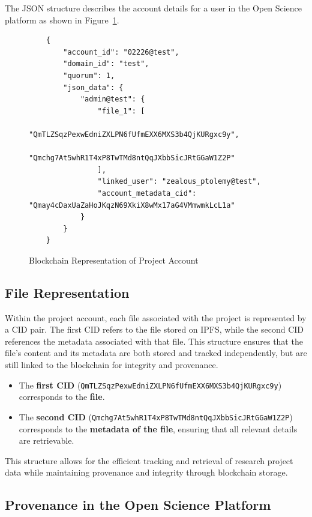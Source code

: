 \documentclass{article}
\begin{document}
The JSON structure describes the account details for a user in the Open Science platform as shown in Figure~\ref{fig:project_blockchain_representation}.


\begin{figure}[h]
      \centering
      \caption{Blockchain Representation of Project Account}
      \label{fig:project_blockchain_representation}
      \begin{verbatim}
    {
        "account_id": "02226@test",
        "domain_id": "test",
        "quorum": 1,
        "json_data": {
            "admin@test": {
                "file_1": [
                    "QmTLZSqzPexwEdniZXLPN6fUfmEXX6MXS3b4QjKURgxc9y",
                    "Qmchg7At5whR1T4xP8TwTMd8ntQqJXbbSicJRtGGaW1Z2P"
                ],
                "linked_user": "zealous_ptolemy@test",
                "account_metadata_cid": "Qmay4cDaxUaZaHoJKqzN69XkiX8wMx17aG4VMmwmkLcL1a"
            }
        }
    }
    \end{verbatim}
\end{figure}


\subsection*{File Representation}

Within the project account, each file associated with the project is represented by a CID pair. The first CID refers to the file stored on IPFS, while the second CID references the metadata associated with that file. This structure ensures that the file's content and its metadata are both stored and tracked independently, but are still linked to the blockchain for integrity and provenance.

\begin{itemize}
      \item The \textbf{first CID} (\texttt{QmTLZSqzPexwEdniZXLPN6fUfmEXX6MXS3b4QjKURgxc9y}) corresponds to the \textbf{file}.
      \item The \textbf{second CID} (\texttt{Qmchg7At5whR1T4xP8TwTMd8ntQqJXbbSicJRtGGaW1Z2P}) corresponds to the \textbf{metadata of the file}, ensuring that all relevant details are retrievable.
\end{itemize}

This structure allows for the efficient tracking and retrieval of research project data while maintaining provenance and integrity through blockchain storage.

\subsection{Provenance in the Open Science Platform}
\end{document}
